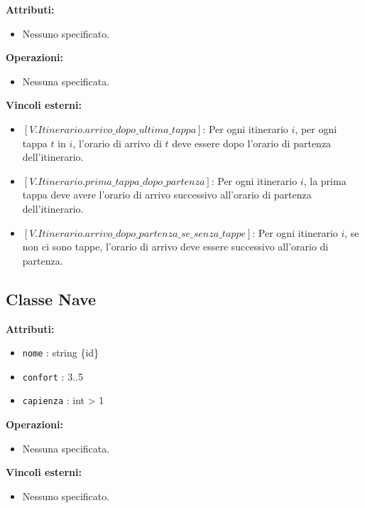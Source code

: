 \documentclass[a4paper]{scrartcl}
\begin{document}
\textbf{Attributi:}
\begin{itemize}
    \item Nessuno specificato.
\end{itemize}

\textbf{Operazioni:}
\begin{itemize}
    \item Nessuna specificata.
\end{itemize}

\textbf{Vincoli esterni:}
\begin{itemize}
    \item $[V.Itinerario.arrivo\_dopo\_ultima\_tappa]$: Per ogni itinerario $i$, per ogni tappa $t$ in $i$, l'orario di arrivo di $t$ deve essere dopo l'orario di partenza dell'itinerario.
    \item $[V.Itinerario.prima\_tappa\_dopo\_partenza]$: Per ogni itinerario $i$, la prima tappa deve avere l'orario di arrivo successivo all'orario di partenza dell'itinerario.
    \item $[V.Itinerario.arrivo\_dopo\_partenza\_se\_senza\_tappe]$: Per ogni itinerario $i$, se non ci sono tappe, l'orario di arrivo deve essere successivo all'orario di partenza.
\end{itemize}

\subsection{Classe Nave}

\textbf{Attributi:}
\begin{itemize}
    \item \texttt{nome} : string \{id\}
    \item \texttt{confort} : 3..5
    \item \texttt{capienza} : int > 1
\end{itemize}

\textbf{Operazioni:}
\begin{itemize}
    \item Nessuna specificata.
\end{itemize}

\textbf{Vincoli esterni:}
\begin{itemize}
    \item Nessuno specificato.
\end{itemize}

\end{document}
